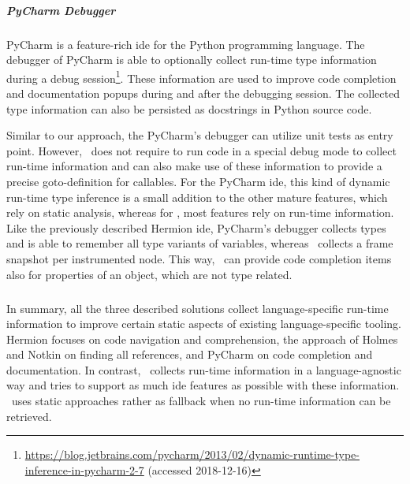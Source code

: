     \subparagraph{PyCharm Debugger}
    PyCharm is a feature-rich \ac{ide} for the Python programming language. The debugger of PyCharm is able to optionally collect run-time type information during a debug session\footnote{\url{https://blog.jetbrains.com/pycharm/2013/02/dynamic-runtime-type-inference-in-pycharm-2-7} (accessed 2018-12-16)}. These information are used to improve code completion and documentation popups during and after the debugging session. The collected type information can also be persisted as docstrings in Python source code.

    Similar to our approach, the PyCharm's debugger can utilize unit tests as entry point. However, \graallsp~does not require to run code in a special debug mode to collect run-time information and can also make use of these information to provide a precise goto-definition for callables. For the PyCharm \ac{ide}, this kind of dynamic run-time type inference is a small addition to the other mature features, which rely on static analysis, whereas for \graallsp, most features rely on run-time information. Like the previously described Hermion \ac{ide}, PyCharm's debugger collects types and is able to remember all type variants of variables, whereas \graallsp~collects a frame snapshot per instrumented node. This way, \graallsp~can provide code completion items also for properties of an object, which are not type related.


    \subparagraph{}
    In summary, all the three described solutions collect language-specific run-time information to improve certain static aspects of existing language-specific tooling. Hermion focuses on code navigation and comprehension, the approach of Holmes and Notkin on finding all references, and PyCharm on code completion and documentation. In contrast, \graallsp~collects run-time information in a language-agnostic way and tries to support as much \ac{ide} features as possible with these information. \graallsp~uses static approaches rather as fallback when no run-time information can be retrieved.

